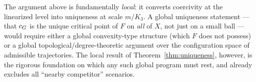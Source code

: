 \begin{remark}
The argument above is fundamentally \emph{local}: it converts
coercivity at the linearized level into uniqueness at scale $m/K_{3}$.
A global uniqueness statement --- that $c_{G}$ is the unique critical
point of $F$ on \emph{all} of $X$, not just on a small ball ---
would require either a global convexity-type structure (which $F$ does
not possess) or a global topological/degree-theoretic argument over
the configuration space of admissible trajectories.  The local result
of Theorem~\ref{thm:uniqueness}, however, is the rigorous foundation
on which any such global program must rest, and already excludes all
``nearby competitor'' scenarios.
\end{remark}

